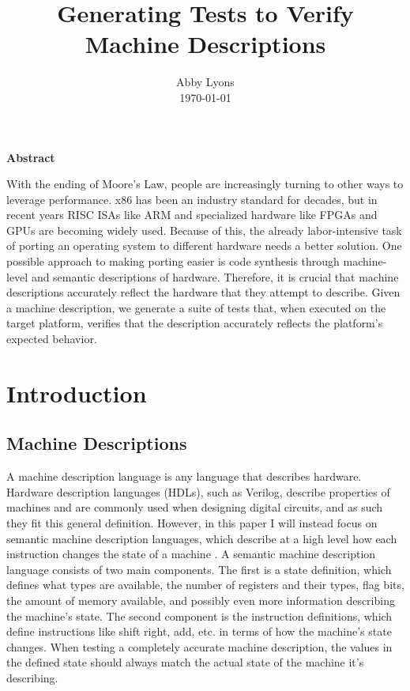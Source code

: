 \documentclass[letterpaper,12pt]{article}
\begin{document}
\title{\bf \LARGE Generating Tests to Verify Machine Descriptions}

\author{
{\rm Abby Lyons}\\
{\rm \today}
}
\maketitle
\thispagestyle{empty}

\vspace*{2\baselineskip}
{\centering
  \bf{Abstract}\par
}
With the ending of Moore's Law, people are increasingly turning to other ways to leverage performance. x86 has been an industry standard for decades, but in recent years RISC ISAs like ARM and specialized hardware like FPGAs and GPUs are becoming widely used. Because of this, the already labor-intensive task of porting an operating system to different hardware needs a better solution. One possible approach to making porting easier is code synthesis through machine-level and semantic descriptions of hardware. Therefore, it is crucial that machine descriptions accurately reflect the hardware that they attempt to describe. Given a machine description, we generate a suite of tests that, when executed on the target platform, verifies that the description accurately reflects the platform's expected behavior.

\pagebreak

\tableofcontents

\pagebreak

\section{Introduction}
\subsection{Machine Descriptions}

A machine description language is any language that describes hardware. Hardware description languages (HDLs), such as Verilog, describe properties of machines and are commonly used when designing digital circuits, and as such they fit this general definition. However, in this paper I will instead focus on semantic machine description languages, which describe at a high level how each instruction changes the state of a machine \cite{Design}. A semantic machine description language consists of two main components. The first is a state definition, which defines what types are available, the number of registers and their types, flag bits, the amount of memory available, and possibly even more information describing the machine's state. The second component is the instruction definitions, which define instructions like shift right, add, etc. in terms of how the machine's state changes. When testing a completely accurate machine description, the values in the defined state should always match the actual state of the machine it's describing.
\end{document}
